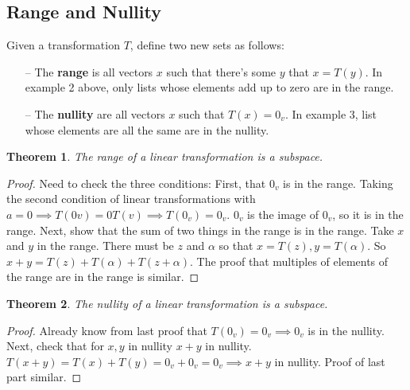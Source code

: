 \documentclass{article}
\newtheorem*{theorem}{Theorem}
\begin{document}
        \subsection{Range and Nullity}
            Given a transformation $T$, define two new sets as follows: 
            \begin{itemize}
                \item[--]  The \textbf{range} is all vectors $x$ such that there's some $y$ that $x = T(y)$. In example 2 above, only lists whose elements add up to zero are in the range.

                \item[--] The \textbf{nullity} are all vectors $x$ such that $T(x) = 0_v$. In example 3, list whose elements are all the same are in the nullity.
            \end{itemize}
            \begin{theorem}
                The range of a linear transformation is a subspace.
            \end{theorem}
            \begin{proof}
                Need to check the three conditions: First, that $0_v$ is in the range. Taking the second condition of linear transformations with $a = 0 \implies T(0v) = 0T(v) \implies T(0_v) = 0_v$. $0_v$ is the image of $0_v$, so it is in the range. Next, show that the sum of two things in the range is in the range. Take $x$ and $y$ in the range. There must be $z$ and $\alpha$ so that $x = T(z), y = T(\alpha)$. So $x + y = T(z) + T(\alpha) + T(z + \alpha)$. The proof that multiples of elements of the range are in the range is similar.
            \end{proof}
            \begin{theorem}
                The nullity of a linear transformation is a subspace.
            \end{theorem}
            \begin{proof}
                Already know from last proof that $T(0_v) = 0_v \implies 0_v$ is in the nullity. Next, check that for $x, y$ in nullity $x + y$ in nullity. $T(x + y) = T(x) + T(y) = 0_v + 0_v = 0_v \implies x + y$ in nullity. Proof of last part similar.
            \end{proof}
\end{document}
